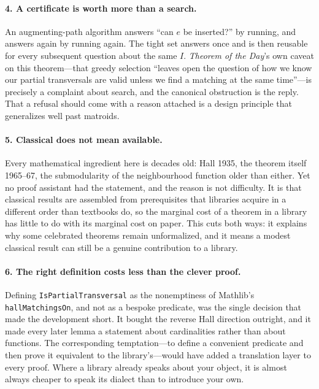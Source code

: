 \documentclass[11pt]{article}
\newcommand{\lean}[1]{\texttt{#1}}
\begin{document}
\paragraph{4. A certificate is worth more than a search.}
An augmenting-path algorithm answers ``can $e$ be inserted?'' by running, and answers again by
running again. The tight set answers once and is then reusable for every subsequent question about
the same $I$. \emph{Theorem of the Day}'s own caveat on this theorem---that greedy selection
``leaves open the question of how we know our partial transversals are valid unless we find a
matching at the same time''---is precisely a complaint about search, and the canonical obstruction
is the reply. That a refusal should come with a reason attached is a design principle that
generalizes well past matroids.

\paragraph{5. Classical does not mean available.}
Every mathematical ingredient here is decades old: Hall 1935, the theorem itself 1965--67, the
submodularity of the neighbourhood function older than either. Yet no proof assistant had the
statement, and the reason is not difficulty. It is that classical results are assembled from
prerequisites that libraries acquire in a different order than textbooks do, so the marginal cost
of a theorem in a library has little to do with its marginal cost on paper. This cuts both ways:
it explains why some celebrated theorems remain unformalized, and it means a modest classical
result can still be a genuine contribution to a library.

\paragraph{6. The right definition costs less than the clever proof.}
Defining \lean{IsPartialTransversal} as the nonemptiness of Mathlib's \lean{hallMatchingsOn}, and
not as a bespoke predicate, was the single decision that made the development short. It bought the
reverse Hall direction outright, and it made every later lemma a statement about cardinalities
rather than about functions. The corresponding temptation---to define a convenient predicate and
then prove it equivalent to the library's---would have added a translation layer to every proof.
Where a library already speaks about your object, it is almost always cheaper to speak its
dialect than to introduce your own.
\end{document}
